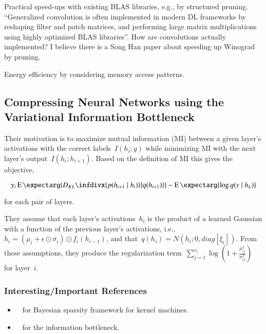 \documentclass[a4paper, 12pt]{article}
\newcommand{\expect}{\operatorname{E}\expectarg}
\newcommand{\infdiv}{D_{KL}\infdivx}
\begin{document}
Practical speed-ups with existing BLAS libraries, e.g., by structured pruning.
``Generalized convolution is often implemented in modern DL frameworks by
reshaping filter and patch matrices, and performing large matrix
multiplications using highly optimized BLAS libraries''. How are convolutions
actually implemented? I believe there is a Song Han paper about speeding up
Winograd by pruning.

Energy efficiency by considering memory access patterns.


\subsection{Compressing Neural Networks using the Variational Information
            Bottleneck~\cite{dai2018vib}}

Their motivation is to maximize mutual information (MI) between a given layer's
activations with the correct labels~$I(h_i ; y)$ while minimizing MI with the
next layer's output~$I(h_i ; h_{i + 1})$. Based on the definition of MI this
gives the objective,

\begin{equation}
        \gamma_i \expect{\infdiv{p(h_{i + 1} \mid h_i)}{q(h_{i + 1})}} - \expect{\log q(y \mid h_L)}
\end{equation}

for each pair of layers.

They assume that each layer's activations~$h_i$ is the product of a learned
Gaussian with a function of the previous layer's activations,
i.e.,~$h_i = (\mu_i + \epsilon \odot \sigma_i) \odot f_i(h_{i - 1})$, and
that~$q(h_i) = N(h_i ; 0, diag[\xi_i])$. From these assumptions, they produce
the regularization
term~$\sum_{j = 1}^{r_i} \log\left(1 + \frac{\mu_{ij}^2}{\sigma_{ij}^2}\right)$
for layer~$i$.


\subsubsection{Interesting/Important References}

\begin{itemize}
        \item~\cite{tipping2001sparse} for Bayesian sparsity framework for
                kernel machines.

        \item~\cite{tishby1999theinformation} for the information bottleneck.
\end{itemize}
\end{document}
